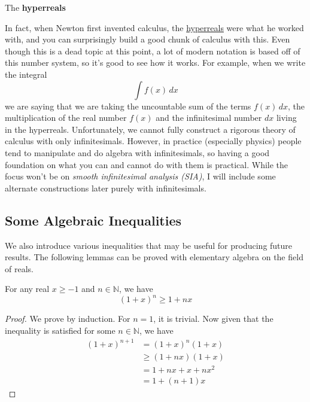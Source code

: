   \begin{theorem}[Hyperreals]
    \label{thm:hyperreals}
    The \textbf{hyperreals} 
  \end{theorem}

  In fact, when Newton first invented calculus, the \hyperref[thm:hyperreals]{hyperreals} were what he worked with, and you can surprisingly build a good chunk of calculus with this. Even though this is a dead topic at this point, a lot of modern notation is based off of this number system, so it's good to see how it works. For example, when we write the integral 
  \begin{equation}
    \int f(x) \,dx
  \end{equation} 
  we are saying that we are taking the uncountable sum of the terms $f(x) \,dx$, the multiplication of the real number $f(x)$ and the infinitesimal number $dx$ living in the hyperreals. Unfortunately, we cannot fully construct a rigorous theory of calculus with only infinitesimals. However, in practice (especially physics) people tend to manipulate and do algebra with infinitesimals, so having a good foundation on what you can and cannot do with them is practical. While the focus won't be on \textit{smooth infinitesimal analysis (SIA)}, I will include some alternate constructions later purely with infinitesimals. 

\subsection{Some Algebraic Inequalities}

  We also introduce various inequalities that may be useful for producing future results. The following lemmas can be proved with elementary algebra on the field of reals. 

  \begin{lemma}
    \label{thm:bernoullis-inequality}
    For any real $x \geq -1$ and $n \in \mathbb{N}$, we have 
    \begin{equation}
      (1 + x)^n \geq 1 + nx
    \end{equation}
  \end{lemma}
  \begin{proof}
    We prove by induction. For $n = 1$, it is trivial. Now given that the inequality is satisfied for some $n \in \mathbb{N}$, we have 
    \begin{align}
      (1 + x)^{n + 1} & = (1 + x)^n (1 + x) \\ 
                      & \geq (1 + nx) (1 + x) \\ 
                      & = 1 + nx + x + nx^2 \\ 
                      & = 1 + (n+1)x
    \end{align}
  \end{proof}

